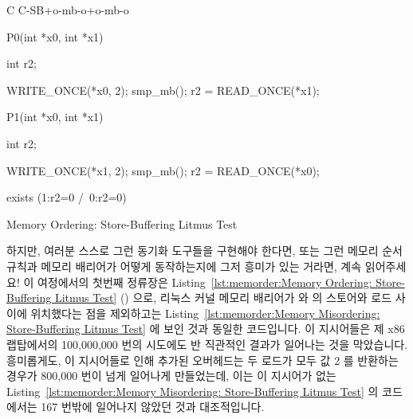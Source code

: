 \begin{listing}[tbp]
{ \scriptsize
\begin{verbbox}[\LstLineNo]
C C-SB+o-mb-o+o-mb-o
{
}

P0(int *x0, int *x1)
{
  int r2;

  WRITE_ONCE(*x0, 2);
  smp_mb();
  r2 = READ_ONCE(*x1);
}


P1(int *x0, int *x1)
{
  int r2;

  WRITE_ONCE(*x1, 2);
  smp_mb();
  r2 = READ_ONCE(*x0);
}

exists (1:r2=0 /\ 0:r2=0)
\end{verbbox}
}
\centering
\theverbbox
\caption{Memory Ordering: Store-Buffering Litmus Test}
\label{lst:memorder:Memory Ordering: Store-Buffering Litmus Test}
\end{listing}

하지만, 여러분 스스로 그런 동기화 도구들을 구현해야 한다면, 또는 그런 메모리
순서 규칙과 메모리 배리어가 어떻게 동작하는지에 그저 흥미가 있는 거라면, 계속
읽어주세요!
이 여정에서의 첫번째 정류장은
Listing~\ref{lst:memorder:Memory Ordering: Store-Buffering Litmus Test}
() 으로,  리눅스 커널 메모리
배리어가  와  의 스토어와 로드 사이에 위치했다는 점을
제외하고는
Listing~\ref{lst:memorder:Memory Misordering: Store-Buffering Litmus Test} 에
보인 것과 동일한 코드입니다.
이 지시어들은 제 x86 랩탑에서의 100,000,000 번의 시도에도 반 직관적인 결과가
일어나는 것을 막았습니다.
흥미롭게도, 이 지시어들로 인해 추가된 오버헤드는 두 로드가 모두 값 2 를
반환하는 경우가 800,000 번이 넘게 일어나게 만들었는데, 이는 이 지시어가 없는
Listing~\ref{lst:memorder:Memory Misordering: Store-Buffering Litmus Test} 의
코드에서는 167 번밖에 일어나지 않았던 것과 대조적입니다.

